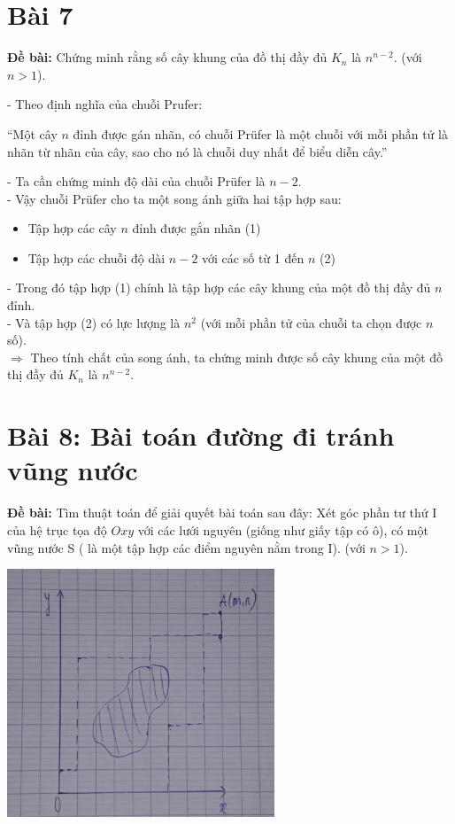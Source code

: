 \documentclass[12pt]{article}
\begin{document}
\begin{sloppypar}
\section{Bài 7}
\begin{tcolorbox}
    \textbf{Đề bài:} Chứng minh rằng số cây khung của đồ thị đầy đủ \(K_{n}\) là \(n^{n-2}\).
    (với \(n > 1\)).
\end{tcolorbox}

- Theo định nghĩa của chuỗi Prufer:

\begin{center}
``Một cây \(n\) đỉnh được gán nhãn, có chuỗi Prüfer là một chuỗi với mỗi phần tử là nhãn từ  nhãn của cây, sao cho nó là chuỗi duy nhất để biểu diễn cây.''
\end{center}

- Ta cần chứng minh độ dài của chuỗi Prüfer là \(n-2\). \\
- Vậy chuỗi Prüfer cho ta một song ánh giữa hai tập hợp sau:

\begin{itemize}
    \item Tập hợp các cây \(n\) đỉnh được gắn nhãn                      (1)
    \item Tập hợp các chuỗi độ dài \(n-2\) với các số từ 1 đến \(n\)    (2)
\end{itemize}

- Trong đó tập hợp (1) chính là tập hợp các cây khung của một đồ thị đầy đủ \(n\) đỉnh. \\
- Và tập hợp (2) có lực lượng là \(n^{2}\) (với mỗi phần tử của chuỗi ta chọn được \(n\) số). \\
\(\Rightarrow\) Theo tính chất của song ánh, ta chứng minh được số cây khung của một đồ thị đầy đủ \(K_{n}\) là \(n^{n-2}\).

\section{Bài 8: Bài toán đường đi tránh vũng nước}
\begin{tcolorbox}
    \textbf{Đề bài:} Tìm thuật toán để giải quyết bài toán sau đây: Xét góc phần tư thứ I của hệ trục tọa độ \(Oxy\) với các lưới nguyên (giống như giấy tập có ô), có một vũng nước S ( là một tập hợp các điểm nguyên nằm trong I).
    (với \(n > 1\)).
\end{tcolorbox}

\begin{center}
    {\includegraphics[width=8cm]{7.png}}
\end{center}


\end{sloppypar}
\end{document}
